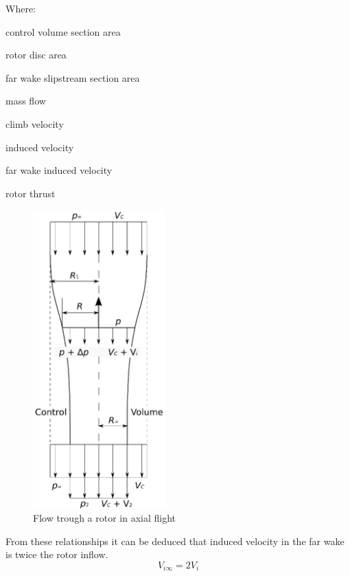 Where:
\begin{description}[align=right,labelwidth=3cm]
  \item [$A_1 = \pi R_1^2$] [m\textsuperscript{2}] control volume section area
  \item [$A_R = \pi R^2$] [m\textsuperscript{2}] rotor disc area
  \item [$A_{\infty} = \pi R_{\infty}^2$] [m\textsuperscript{2}] far wake slipstream section area
  \item [$\dot m$] [kg/s] mass flow
  \item [$V_C$] [m/s] climb velocity
  \item [$V_i$] [m/s] induced velocity
  \item [$V_{i \infty}$] [m/s] far wake induced velocity
  \item [$T$] [N] rotor thrust
\end{description}

\begin{figure}[h!]
  \centering
  \includegraphics[width=51mm]{eps/momentum_theory_axial.eps}
  \caption{Flow trough a rotor in axial flight}
\end{figure}

From these relationships it can be deduced that induced velocity in the far wake is twice the rotor inflow. \cite{Padfield2007}
\begin{equation}
  \label{eq-aero-indeced-vel}
  V_{i \infty} = 2 V_i
\end{equation}

